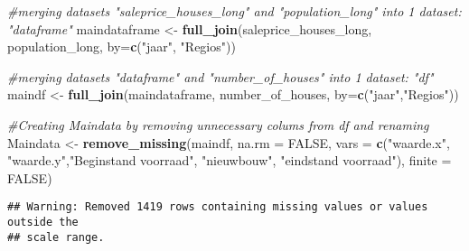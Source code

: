 \documentclass[
]{article}
\newenvironment{Shaded}{\begin{snugshade}}{\end{snugshade}}
\newcommand{\AttributeTok}[1]{\textcolor[rgb]{0.13,0.29,0.53}{#1}}
\newcommand{\CommentTok}[1]{\textcolor[rgb]{0.56,0.35,0.01}{\textit{#1}}}
\newcommand{\ConstantTok}[1]{\textcolor[rgb]{0.56,0.35,0.01}{#1}}
\newcommand{\FunctionTok}[1]{\textcolor[rgb]{0.13,0.29,0.53}{\textbf{#1}}}
\newcommand{\NormalTok}[1]{#1}
\newcommand{\OtherTok}[1]{\textcolor[rgb]{0.56,0.35,0.01}{#1}}
\newcommand{\SpecialCharTok}[1]{\textcolor[rgb]{0.81,0.36,0.00}{\textbf{#1}}}
\newcommand{\StringTok}[1]{\textcolor[rgb]{0.31,0.60,0.02}{#1}}
\begin{document}
\begin{Shaded}
\end{Shaded}

\begin{Shaded}
\begin{Highlighting}[]
\CommentTok{\#merging datasets "saleprice\_houses\_long" and "population\_long" into 1 dataset: "dataframe"}
\NormalTok{maindataframe }\OtherTok{\textless{}{-}} \FunctionTok{full\_join}\NormalTok{(saleprice\_houses\_long, population\_long, }\AttributeTok{by=}\FunctionTok{c}\NormalTok{(}\StringTok{"jaar"}\NormalTok{, }\StringTok{"Regio\textquotesingle{}s"}\NormalTok{))}

\CommentTok{\#merging datasets "dataframe" and "number\_of\_houses" into 1 dataset: "df"}
\NormalTok{maindf }\OtherTok{\textless{}{-}} \FunctionTok{full\_join}\NormalTok{(maindataframe, number\_of\_houses, }\AttributeTok{by=}\FunctionTok{c}\NormalTok{(}\StringTok{"jaar"}\NormalTok{,}\StringTok{"Regio\textquotesingle{}s"}\NormalTok{))}

\CommentTok{\#Creating Maindata by removing unnecessary colums from df and renaming}
\NormalTok{Maindata }\OtherTok{\textless{}{-}} \FunctionTok{remove\_missing}\NormalTok{(maindf, }\AttributeTok{na.rm =} \ConstantTok{FALSE}\NormalTok{,}
                           \AttributeTok{vars =} \FunctionTok{c}\NormalTok{(}\StringTok{"waarde.x"}\NormalTok{, }\StringTok{"waarde.y"}\NormalTok{,}\StringTok{"Beginstand voorraad"}\NormalTok{, }\StringTok{"nieuwbouw"}\NormalTok{, }\StringTok{"eindstand voorraad"}\NormalTok{), }
                           \AttributeTok{finite =} \ConstantTok{FALSE}\NormalTok{)}
\end{Highlighting}
\end{Shaded}

\begin{verbatim}
## Warning: Removed 1419 rows containing missing values or values outside the
## scale range.
\end{verbatim}
\end{document}
